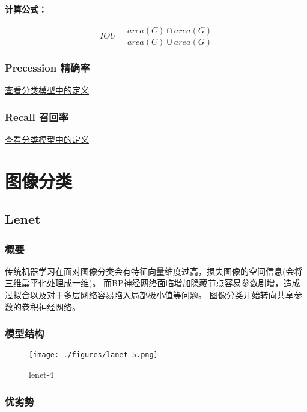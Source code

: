 \documentclass{article}
\newcommand{\tao}[1]{\todo[color=red!20,size=\footnotesize]{T: #1}{}}
\begin{document}
\begin{CJK}{UTF8}{gbsn}
\paragraph{计算公式：}
\begin{equation}
    IOU = \frac{area(C)\cap area(G)}{area(C)\cup area(G)}
\end{equation}

\subsubsection{Precession 精确率}
\hyperlink{precession}{查看分类模型中的定义}

\subsubsection{Recall 召回率}
\hyperlink{recall}{查看分类模型中的定义}

\section{图像分类}
\subsection{Lenet}
\subsubsection{概要}
\CJKindent
传统机器学习在面对图像分类会有特征向量维度过高，损失图像的空间信息(会将三维扁平化处理成一维)。
而BP神经网络面临增加隐藏节点容易参数剧增，造成过拟合以及对于多层网络容易陷入局部极小值等问题。
图像分类开始转向共享参数的卷积神经网络。
\subsubsection{模型结构}


\begin{figure}[!h]
    \centering
    \texttt{[image: ./figures/lanet-5.png]}
    \caption{lenet-4}
    \label{fig:lenet}
\end{figure}


\subsubsection{优劣势}

\end{CJK}
\end{document}
